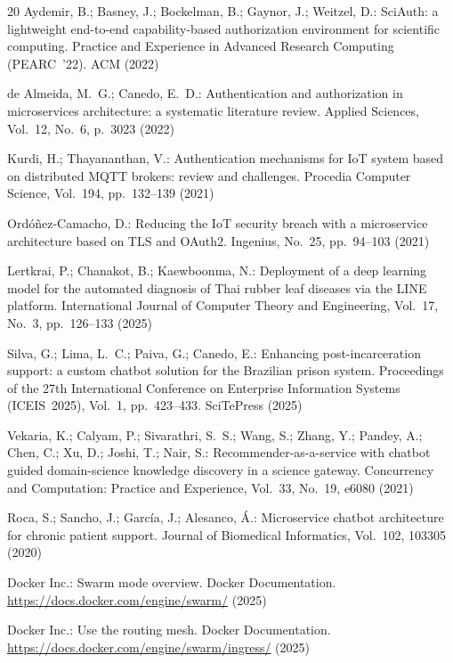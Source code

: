 \begin{thebibliography}{20}
 Aydemir, B.; Basney, J.; Bockelman, B.; Gaynor, J.; Weitzel, D.: SciAuth: a lightweight end-to-end capability-based authorization environment for scientific computing. Practice and Experience in Advanced Research Computing (PEARC~'22). ACM (2022)

 de Almeida, M.~G.; Canedo, E.~D.: Authentication and authorization in microservices architecture: a systematic literature review. Applied Sciences, Vol.~12, No.~6, p.~3023 (2022)

 Kurdi, H.; Thayananthan, V.: Authentication mechanisms for IoT system based on distributed MQTT brokers: review and challenges. Procedia Computer Science, Vol.~194, pp.~132--139 (2021)

 Ordóñez-Camacho, D.: Reducing the IoT security breach with a microservice architecture based on TLS and OAuth2. Ingenius, No.~25, pp.~94--103 (2021)

 Lertkrai, P.; Chanakot, B.; Kaewboonma, N.: Deployment of a deep learning model for the automated diagnosis of Thai rubber leaf diseases via the LINE platform. International Journal of Computer Theory and Engineering, Vol.~17, No.~3, pp.~126--133 (2025)

 Silva, G.; Lima, L.~C.; Paiva, G.; Canedo, E.: Enhancing post-incarceration support: a custom chatbot solution for the Brazilian prison system. Proceedings of the 27th International Conference on Enterprise Information Systems (ICEIS~2025), Vol.~1, pp.~423--433. SciTePress (2025)

 Vekaria, K.; Calyam, P.; Sivarathri, S.~S.; Wang, S.; Zhang, Y.; Pandey, A.; Chen, C.; Xu, D.; Joshi, T.; Nair, S.: Recommender-as-a-service with chatbot guided domain-science knowledge discovery in a science gateway. Concurrency and Computation: Practice and Experience, Vol.~33, No.~19, e6080 (2021)

 Roca, S.; Sancho, J.; García, J.; Alesanco, Á.: Microservice chatbot architecture for chronic patient support. Journal of Biomedical Informatics, Vol.~102, 103305 (2020)

 Docker Inc.: Swarm mode overview. Docker Documentation. \url{https://docs.docker.com/engine/swarm/} (2025)

 Docker Inc.: Use the routing mesh. Docker Documentation. \url{https://docs.docker.com/engine/swarm/ingress/} (2025)

\end{thebibliography}


